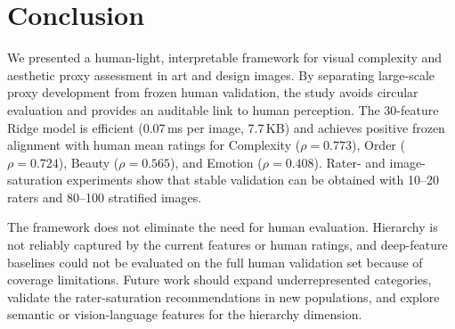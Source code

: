
\section{Conclusion}
\label{sec:conclusion}

We presented a human-light, interpretable framework for visual complexity and aesthetic proxy assessment in art and design images. By separating large-scale proxy development from frozen human validation, the study avoids circular evaluation and provides an auditable link to human perception. The 30-feature Ridge model is efficient (0.07\,ms per image, 7.7\,KB) and achieves positive frozen alignment with human mean ratings for Complexity ($\rho = 0.773$), Order ($\rho = 0.724$), Beauty ($\rho = 0.565$), and Emotion ($\rho = 0.408$). Rater- and image-saturation experiments show that stable validation can be obtained with 10--20 raters and 80--100 stratified images.

The framework does not eliminate the need for human evaluation. Hierarchy is not reliably captured by the current features or human ratings, and deep-feature baselines could not be evaluated on the full human validation set because of coverage limitations. Future work should expand underrepresented categories, validate the rater-saturation recommendations in new populations, and explore semantic or vision-language features for the hierarchy dimension.

